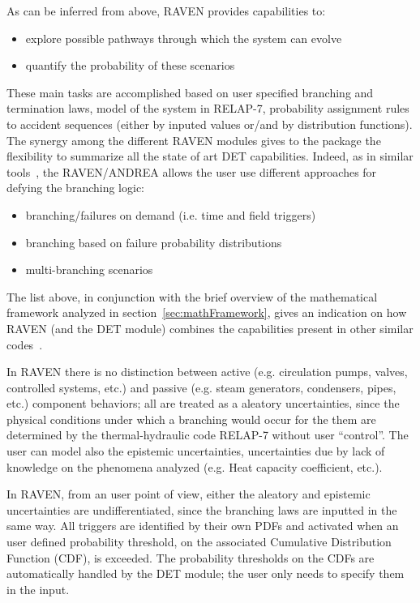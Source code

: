 As can be inferred from above, RAVEN provides capabilities to:
\vspace{-5mm}
\begin{itemize}
\itemsep0em
\item explore possible pathways through which the system can evolve
\item quantify the probability of these scenarios
\end{itemize}
\vspace{-5mm}
These main tasks are accomplished based on user specified branching and termination laws, model of the system in RELAP-7, probability assignment rules to accident sequences (either by inputed values or/and by distribution functions).
The synergy among the different RAVEN modules gives to the package the flexibility to summarize all the state of art DET capabilities. 
Indeed, as in similar tools~\cite{ADAPTHakobyan}, the RAVEN/ANDREA allows the user use different approaches for defying the branching logic:
\vspace{-5mm}
\begin{itemize}
\itemsep0em
\item branching/failures on demand (i.e. time and field triggers)
\item branching based on failure probability distributions
\item multi-branching scenarios
\end{itemize}
\vspace{-5mm}
The list above, in conjunction with the brief overview of the mathematical framework analyzed in section~\ref{sec:mathFramework}, gives an indication on how RAVEN (and the DET module) combines the capabilities present in other similar codes~\cite{ADAPTHakobyan}.  

In RAVEN there is no distinction between active (e.g. circulation pumps, valves, controlled systems, etc.) and passive (e.g. steam generators, condensers, pipes, etc.) component behaviors; all are treated as a aleatory uncertainties, since the physical conditions under which a branching would occur for the them are determined by the thermal-hydraulic code RELAP-7 without user ``control''. The user can model also the epistemic uncertainties, uncertainties due by lack of knowledge on the phenomena analyzed (e.g. Heat capacity coefficient, etc.). 

In RAVEN, from an user point of view, either the aleatory and epistemic uncertainties are undifferentiated, since the branching laws are inputted in the same way. All triggers are identified by their own PDFs and activated when an user defined probability threshold, on the associated Cumulative Distribution Function (CDF), is exceeded.
The probability thresholds on the CDFs are automatically handled by the DET module; the user only needs to specify them in the input.

